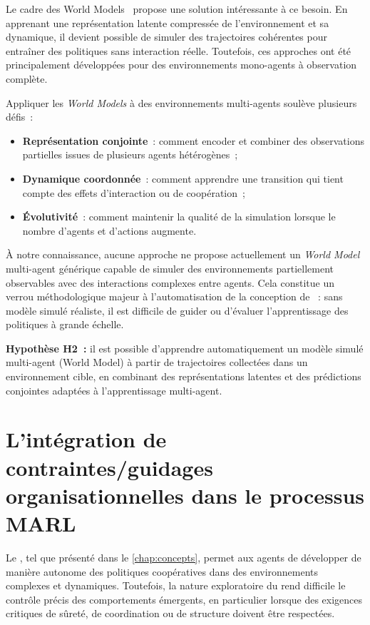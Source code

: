 \medskip

\noindent
Le cadre des World Models~\cite{Ha2018} propose une solution intéressante à ce besoin. En apprenant une représentation latente compressée de l'environnement et sa dynamique, il devient possible de simuler des trajectoires cohérentes pour entraîner des politiques sans interaction réelle. Toutefois, ces approches ont été principalement développées pour des environnements mono-agents à observation complète.

\noindent
Appliquer les \textit{World Models} à des environnements multi-agents soulève plusieurs défis~:
\begin{itemize}
  \item \textbf{Représentation conjointe}~: comment encoder et combiner des observations partielles issues de plusieurs agents hétérogènes~;
  \item \textbf{Dynamique coordonnée}~: comment apprendre une transition qui tient compte des effets d'interaction ou de coopération~;
  \item \textbf{Évolutivité}~: comment maintenir la qualité de la simulation lorsque le nombre d'agents et d'actions augmente.
\end{itemize}

\noindent
À notre connaissance, aucune approche ne propose actuellement un \textit{World Model} multi-agent générique capable de simuler des environnements partiellement observables avec des interactions complexes entre agents. Cela constitue un verrou méthodologique majeur à l'automatisation de la conception de ~: sans modèle simulé réaliste, il est difficile de guider ou d'évaluer l'apprentissage des politiques à grande échelle.

\medskip

\noindent
\textbf{Hypothèse H2~:} il est possible d'apprendre automatiquement un modèle simulé multi-agent (World Model) à partir de trajectoires collectées dans un environnement cible, en combinant des représentations latentes et des prédictions conjointes adaptées à l'apprentissage multi-agent.


\section{L'intégration de contraintes/guidages organisationnelles dans le processus MARL}

\noindent
Le , tel que présenté dans le \autoref{chap:concepts}, permet aux agents de développer de manière autonome des politiques coopératives dans des environnements complexes et dynamiques. Toutefois, la nature exploratoire du  rend difficile le contrôle précis des comportements émergents, en particulier lorsque des exigences critiques de sûreté, de coordination ou de structure doivent être respectées.

